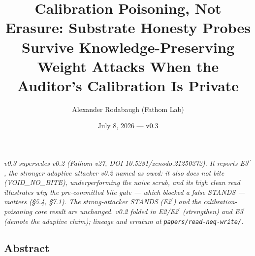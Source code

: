 \documentclass[
  11pt,
]{article}
\title{Calibration Poisoning, Not Erasure: Substrate Honesty Probes
Survive Knowledge-Preserving Weight Attacks When the Auditor's
Calibration Is Private}
\author{Alexander Rodabaugh (Fathom Lab)}
\date{July 8, 2026 --- v0.3}
\begin{document}
\maketitle

\emph{v0.3 supersedes v0.2 (Fathom v27, DOI 10.5281/zenodo.21250272). It
reports E3$^{\prime\prime}$, the stronger adaptive attacker v0.2 named as owed: it also
does not bite (VOID\_NO\_BITE), underperforming the naive scrub, and its
high clean read illustrates why the pre-committed bite gate --- which
blocked a false STANDS --- matters (\S{}5.4, \S{}7.1). The strong-attacker
STANDS (E2$^\prime$) and the calibration-poisoning core result are unchanged.
v0.2 folded in E2/E2$^\prime$ (strengthen) and E3$^\prime$ (demote the adaptive claim);
lineage and erratum at \texttt{papers/read-neq-write/}.}

\subsection{Abstract}\label{abstract}
\end{document}
